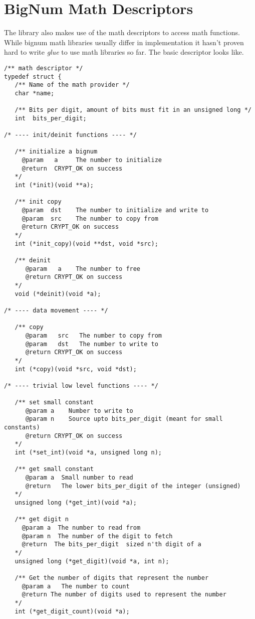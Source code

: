 \documentclass[synpaper]{book}
\newcommand{\mysection}[1]    %
	{                   %
	\section{#1}
   \markboth{\textsf{www.libtom.org}}{\thesection ~ {#1}}
	}
\begin{document}
\mysection{BigNum Math Descriptors}
The library also makes use of the math descriptors to access math functions.  While bignum math libraries usually differ in implementation
it hasn't proven hard to write \textit{glue} to use math libraries so far.  The basic descriptor looks like.

\begin{small}
\begin{verbatim}
/** math descriptor */
typedef struct {
   /** Name of the math provider */
   char *name;

   /** Bits per digit, amount of bits must fit in an unsigned long */
   int  bits_per_digit;

/* ---- init/deinit functions ---- */

   /** initialize a bignum
     @param   a     The number to initialize
     @return  CRYPT_OK on success
   */
   int (*init)(void **a);

   /** init copy
     @param  dst    The number to initialize and write to
     @param  src    The number to copy from
     @return CRYPT_OK on success
   */
   int (*init_copy)(void **dst, void *src);

   /** deinit
      @param   a    The number to free
      @return CRYPT_OK on success
   */
   void (*deinit)(void *a);

/* ---- data movement ---- */

   /** copy
      @param   src   The number to copy from
      @param   dst   The number to write to
      @return CRYPT_OK on success
   */
   int (*copy)(void *src, void *dst);

/* ---- trivial low level functions ---- */

   /** set small constant
      @param a    Number to write to
      @param n    Source upto bits_per_digit (meant for small constants)
      @return CRYPT_OK on success
   */
   int (*set_int)(void *a, unsigned long n);

   /** get small constant
      @param a  Small number to read
      @return   The lower bits_per_digit of the integer (unsigned)
   */
   unsigned long (*get_int)(void *a);

   /** get digit n
     @param a  The number to read from
     @param n  The number of the digit to fetch
     @return  The bits_per_digit  sized n'th digit of a
   */
   unsigned long (*get_digit)(void *a, int n);

   /** Get the number of digits that represent the number
     @param a   The number to count
     @return The number of digits used to represent the number
   */
   int (*get_digit_count)(void *a);


\end{verbatim}
\end{small}
\end{document}
